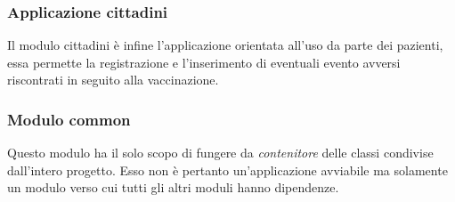 \subsubsection*{Applicazione cittadini}
	Il modulo cittadini è infine l'applicazione orientata all'uso da parte dei pazienti, essa permette la registrazione e l'inserimento di eventuali evento avversi riscontrati in seguito alla vaccinazione.
	
	
\subsubsection*{Modulo common}
	Questo modulo ha il solo scopo di fungere da \emph{contenitore} delle classi condivise dall'intero progetto.
	Esso non è pertanto un'applicazione avviabile ma solamente un modulo verso cui tutti gli altri moduli hanno dipendenze.